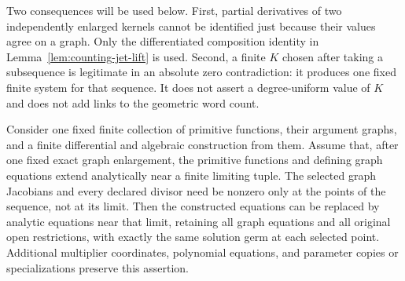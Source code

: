 Two consequences will be used below.  First, partial derivatives of
two independently enlarged kernels cannot be identified just because
their values agree on a graph.  Only the differentiated composition
identity in Lemma~\ref{lem:counting-jet-lift} is used.  Second, a
finite $K$ chosen after taking a subsequence is legitimate in an
absolute zero contradiction: it produces one fixed finite system for
that sequence.  It does not assert a degree-uniform value of $K$ and
does not add links to the geometric word count.

\begin{lemma}
\label{lem:counting-cleared-closure}
Consider one fixed finite collection of primitive functions, their
argument graphs, and a finite differential and algebraic construction
from them.  Assume that, after one fixed exact graph enlargement, the
primitive functions and defining graph equations extend analytically
near a finite limiting tuple.  The selected graph Jacobians and every
declared divisor need be nonzero only at the points of the sequence,
not at its limit.  Then the constructed equations can be replaced by
analytic equations near that limit, retaining all graph equations and
all original open restrictions, with exactly the same solution germ
at each selected point.  Additional multiplier coordinates, polynomial
equations, and parameter copies or specializations preserve this
assertion.
\end{lemma}

